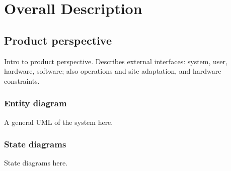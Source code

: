 \section{Overall Description}

\subsection{Product perspective}
Intro to product perspective. Describes external interfaces: system,
user, hardware, software; also
operations and site adaptation, and
hardware constraints.

\subsubsection{Entity diagram}
A general UML of the system here.

\subsubsection{State diagrams}
State diagrams here.

